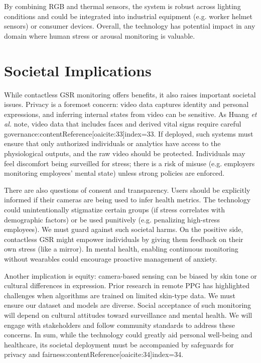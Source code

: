     By combining RGB and thermal sensors, the system is robust across lighting conditions and could be integrated into industrial equipment (e.g. worker helmet sensors) or consumer devices. Overall, the technology has potential impact in any domain where human stress or arousal monitoring is valuable.


    \section{Societal Implications}
    While contactless GSR monitoring offers benefits, it also raises important societal issues. Privacy is a foremost concern: video data captures identity and personal expressions, and inferring internal states from video can be sensitive. As Huang \emph{et al.} note, video data that includes faces and derived vital signs require careful governance:contentReference[oaicite:33]{index=33}. If deployed, such systems must ensure that only authorized individuals or analytics have access to the physiological outputs, and the raw video should be protected. Individuals may feel discomfort being surveilled for stress; there is a risk of misuse (e.g. employers monitoring employees’ mental state) unless strong policies are enforced.

    There are also questions of consent and transparency. Users should be explicitly informed if their cameras are being used to infer health metrics. The technology could unintentionally stigmatize certain groups (if stress correlates with demographic factors) or be used punitively (e.g. penalizing high-stress employees). We must guard against such societal harms. On the positive side, contactless GSR might empower individuals by giving them feedback on their own stress (like a mirror). In mental health, enabling continuous monitoring without wearables could encourage proactive management of anxiety.

    Another implication is equity: camera-based sensing can be biased by skin tone or cultural differences in expression. Prior research in remote PPG has highlighted challenges when algorithms are trained on limited skin-type data. We must ensure our dataset and models are diverse. Social acceptance of such monitoring will depend on cultural attitudes toward surveillance and mental health. We will engage with stakeholders and follow community standards to address these concerns. In sum, while the technology could greatly aid personal well-being and healthcare, its societal deployment must be accompanied by safeguards for privacy and fairness:contentReference[oaicite:34]{index=34}.


